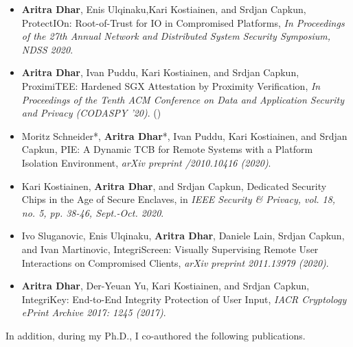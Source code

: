 \begin{itemize}
  
  \item \textbf{Aritra Dhar}, Enis Ulqinaku,Kari Kostiainen, and Srdjan Capkun, ProtectIOn: Root-of-Trust for IO in Compromised Platforms, \emph{In Proceedings of the 27th Annual Network and Distributed System Security Symposium, NDSS 2020}. 
  
  \item \textbf{Aritra Dhar}, Ivan Puddu, Kari Kostiainen, and Srdjan Capkun, ProximiTEE: Hardened SGX Attestation by Proximity Verification, \emph{In Proceedings of the Tenth ACM Conference on Data and Application Security and Privacy (CODASPY '20)}. (\faTrophy)
  
  \item Moritz Schneider*, \textbf{Aritra Dhar}*, Ivan Puddu, Kari Kostiainen, and Srdjan Capkun, PIE: A Dynamic TCB for Remote Systems with a Platform Isolation Environment, \emph{arXiv preprint /2010.10416 (2020)}.
  
  \item Kari Kostiainen, \textbf{Aritra Dhar}, and Srdjan Capkun, Dedicated Security Chips in the Age of Secure Enclaves, in \emph{IEEE Security \& Privacy, vol. 18, no. 5, pp. 38-46, Sept.-Oct. 2020}.
  
  \item Ivo Sluganovic, Enis Ulqinaku, \textbf{Aritra Dhar}, Daniele Lain, Srdjan Capkun, and Ivan Martinovic, IntegriScreen: Visually Supervising Remote User Interactions on Compromised Clients, \emph{arXiv preprint 2011.13979 (2020)}.
   
  \item \textbf{Aritra Dhar}, Der-Yeuan Yu, Kari Kostiainen, and Srdjan Capkun, IntegriKey: End-to-End Integrity Protection of User Input, \emph{IACR Cryptology ePrint Archive 2017: 1245 (2017)}.
 
\end{itemize}

 In addition, during my Ph.D., I co-authored the following publications.
 
